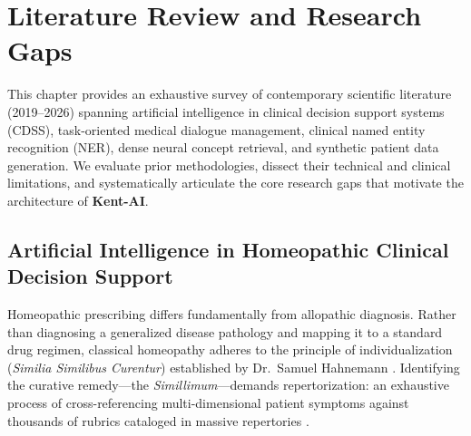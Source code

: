\chapter{Literature Review and Research Gaps}
\label{Chapter2}

\begin{sloppypar}
This chapter provides an exhaustive survey of contemporary scientific literature (2019--2026) spanning artificial intelligence in clinical decision support systems (CDSS), task-oriented medical dialogue management, clinical named entity recognition (NER), dense neural concept retrieval, and synthetic patient data generation. We evaluate prior methodologies, dissect their technical and clinical limitations, and systematically articulate the core research gaps that motivate the architecture of \textbf{Kent-AI}.

\section{Artificial Intelligence in Homeopathic Clinical Decision Support}
Homeopathic prescribing differs fundamentally from allopathic diagnosis. Rather than diagnosing a generalized disease pathology and mapping it to a standard drug regimen, classical homeopathy adheres to the principle of individualization (\emph{Similia Similibus Curentur}) established by Dr.~Samuel Hahnemann \cite{Hahnemann1810}. Identifying the curative remedy---the \emph{Simillimum}---demands repertorization: an exhaustive process of cross-referencing multi-dimensional patient symptoms against thousands of rubrics cataloged in massive repertories \cite{Kent1897}.


\end{sloppypar}

